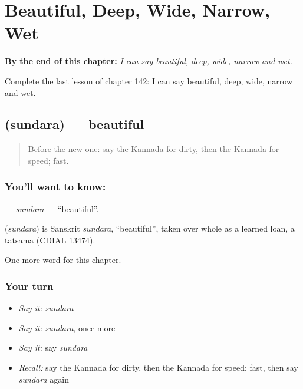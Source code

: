 
\chapter{Beautiful, Deep, Wide, Narrow, Wet}
\label{ch:ka-beautiful-deep-wide-narrow-wet}

\begin{chapteropening}
\textbf{By the end of this chapter:} \emph{I can say beautiful, deep, wide, narrow and wet.}

Complete the last lesson of chapter 142: I can say beautiful, deep, wide, narrow and wet.
\end{chapteropening}

\section[\texorpdfstring{\kn{ಸುಂದರ} (sundara)}{ಸುಂದರ (sundara)}]{ (sundara) — beautiful}

\label{lesson:KA-C142-sundara}



\begin{quote}
Before the new one: say the Kannada for dirty, then the Kannada for speed; fast.
\end{quote}

\subsection*{You'll want to know: }
\textbf{} — \emph{sundara} — \textquotedblleft{}beautiful\textquotedblright{}.

\begin{cousinweb}
\textbf{} (\emph{sundara}) is Sanskrit \emph{sundara}, \textquotedblleft{}beautiful\textquotedblright{}, taken over whole as a learned loan, a tatsama (CDIAL 13474).
\end{cousinweb}

\begin{grammarlens}[title={What you've built}]
One more word for this chapter.
\end{grammarlens}

\subsection*{Your turn}
\begin{itemize}
\raggedright
  \item \emph{Say it:} \emph{sundara}
  \item \emph{Say it:} \emph{sundara}, once more
  \item \emph{Say it:} say \emph{sundara}
  \item \emph{Recall:} say the Kannada for dirty, then the Kannada for speed; fast, then say \emph{sundara} again
\end{itemize}

